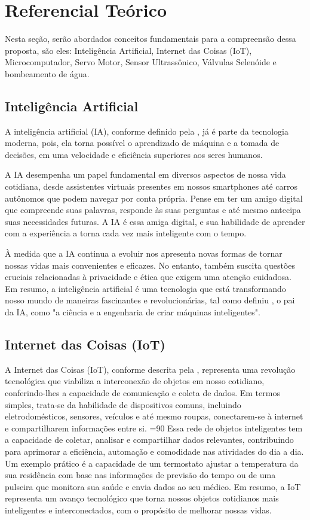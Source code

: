 \section{Referencial Teórico} \label{sec:refTeorico}
Nesta seção, serão abordados conceitos fundamentais para a compreensão dessa proposta, são eles: Inteligência Artificial, Internet das Coisas (IoT), Microcomputador, Servo Motor, Sensor Ultrassônico, Válvulas Selenóide e bombeamento de água. 

\subsection{Inteligência Artificial}
A inteligência artificial (IA), conforme definido pela \cite{ia}, já é parte da tecnologia moderna, pois, ela torna possível o aprendizado de máquina e a tomada de decisões, em uma velocidade e eficiência superiores aos seres humanos.

A IA desempenha um papel fundamental em diversos aspectos de nossa vida cotidiana, desde assistentes virtuais presentes em nossos smartphones até carros autônomos que podem navegar por conta própria. Pense em ter um amigo digital que compreende suas palavras, responde às suas perguntas e até mesmo antecipa suas necessidades futuras. A IA é essa amiga digital, e sua habilidade de aprender com a experiência a torna cada vez mais inteligente com o tempo.

À medida que a IA continua a evoluir nos apresenta novas formas de   tornar nossas vidas mais convenientes e eficazes. No entanto, também suscita questões cruciais relacionadas à privacidade e ética que exigem uma atenção cuidadosa. Em resumo, a inteligência artificial é uma tecnologia que está transformando nosso mundo de maneiras fascinantes e revolucionárias, tal como definiu \cite{John}, o pai da IA, como "a ciência e a engenharia de criar máquinas inteligentes".


\subsection{Internet das Coisas (IoT)}
A Internet das Coisas (IoT), conforme descrita pela \cite{iot}, representa uma revolução tecnológica que viabiliza a interconexão de objetos em nosso cotidiano, conferindo-lhes a capacidade de comunicação e coleta de dados. Em termos simples, trata-se da habilidade de dispositivos comuns, incluindo eletrodomésticos, sensores, veículos e até mesmo roupas, conectarem-se à internet e compartilharem informações entre si.
=90
Essa rede de objetos inteligentes tem a capacidade de coletar, analisar e compartilhar dados relevantes, contribuindo para aprimorar a eficiência, automação e comodidade nas atividades do dia a dia. Um exemplo prático é a capacidade de um termostato ajustar a temperatura da sua residência com base nas informações de previsão do tempo ou de uma pulseira que monitora sua saúde e envia dados ao seu médico. Em resumo, a IoT representa um avanço tecnológico que torna nossos objetos cotidianos mais inteligentes e interconectados, com o propósito de melhorar nossas vidas.

